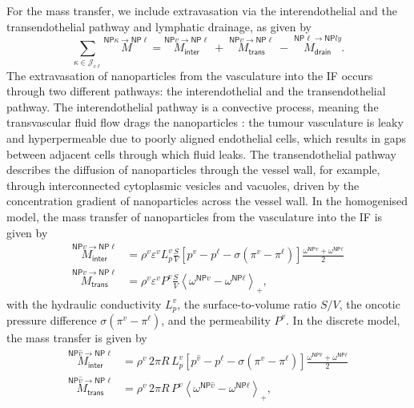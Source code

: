 \documentclass[Times1COL,AMA]{WileyNJDv5} %
\newcommand{\NP}{{\textsf{NP}}}
\newcommand{\omegaNPl}{\omega^{\textsf{NP}\ell}}
\newcommand{\omegaNPv}{\omega^{\textsf{NP}v}}
\newcommand{\omegaNPvhat}{\omega^{\textsf{NP}\hat{v}}}
\newcommand{\soverset}[2]{\overset{\scriptscriptstyle #1}{#2}}
\begin{document}
For the mass transfer, we include extravasation via the interendothelial and the transendothelial pathway and lymphatic drainage, as given by
\begin{equation}
    \sum\limits_{\kappa \in \mathcal{J}_{c\ell}} \soverset{\NP\kappa \rightarrow \NP\ell}{M}
    =
    \soverset{\NP v \rightarrow \NP\ell}{M_{\textsf{inter}}}
    \; + \;
    \soverset{\NP v \rightarrow \NP\ell}{M_{\textsf{trans}}}
    \; - \;
    \soverset{\NP\ell \rightarrow \NP{ly}}{M_{\textsf{drain}}}.
\end{equation}
The extravasation of nanoparticles from the vasculature into the IF occurs through two different pathways:
the interendothelial and the transendothelial pathway. \cite{Wilhelm2016,Moghimi2018}
The interendothelial pathway is a convective process, meaning the transvascular fluid flow drags the nanoparticles \cite{Jain1987}:
the tumour vasculature is leaky and hyperpermeable due to poorly aligned endothelial cells, which results in gaps between adjacent cells through which fluid leaks. \cite{Jain2010}
The transendothelial pathway describes the diffusion of nanoparticles through the vessel wall, for example, through interconnected cytoplasmic vesicles and vacuoles, driven by the concentration gradient of nanoparticles across the vessel wall. \cite{Wilhelm2016}
In the homogenised model, the mass transfer of nanoparticles from the vasculature into the IF is given by
\begin{subequations}
    \label{Eq:CrossingBloodVesselWallHomogenised}
    \begin{align}
        \soverset{\NP v \rightarrow \NP\ell}{M_{\textsf{inter}}}
         & =
        \rho^v \varepsilon^v L_p^v \frac{S}{V}
        \left[
            p^v - p^\ell - \sigma \left( \pi^v - \pi^\ell \right)
            \right] \tfrac{\omegaNPv + \omegaNPl}{2}
        \\
        \soverset{\NP v \rightarrow \NP\ell}{M_{\textsf{trans}}}
         & =
        \rho^v \varepsilon^v P^{v} \frac{S}{V} \left\langle \omegaNPv - \omegaNPl \right\rangle _+,
    \end{align}
\end{subequations}
with the hydraulic conductivity $L_p^v$, the surface-to-volume ratio $S/V$, the oncotic pressure difference $\sigma (\pi^v - \pi^\ell)$, and the permeability $P^{v}$.
In the discrete model, the mass transfer is given by
\begin{subequations}
    \label{Eq:CrossingBloodVesselWallDiscrete}
    \begin{align}
        \soverset{\NP \hat{v} \rightarrow \NP\ell}{M_{\textsf{inter}}}
         & =
        \rho^v \, 2 \pi R \, L_p^v
        \left[
            p^{\hat{v}} - p^\ell - \sigma \left( \pi^v - \pi^\ell \right)
            \right] \tfrac{\omegaNPvhat + \omegaNPl}{2}
        \\
        \soverset{\NP \hat{v} \rightarrow \NP\ell}{M_{\textsf{trans}}}
         & =
        \rho^v \, 2 \pi R \, P^v \left\langle \omegaNPvhat - \omegaNPl \right\rangle _+,
    \end{align}
\end{subequations}
\end{document}
